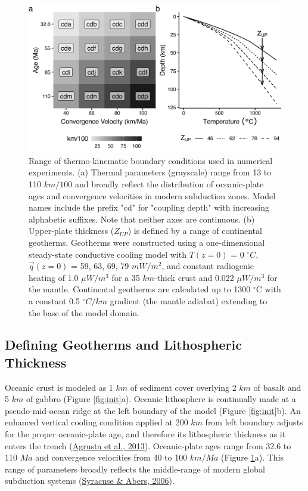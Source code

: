 \begin{figure}[htbp]

{\centering \includegraphics[width=1\linewidth,]{assets/figs/chpt2/fig2} 

}

\caption[Range of boundary conditions used in numerical experiments]{Range of thermo-kinematic boundary conditions used in numerical experiments. (a) Thermal parameters (grayscale) range from 13 to 110 $km/100$ and broadly reflect the distribution of oceanic-plate ages and convergence velocities in modern subduction zones. Model names include the prefix "cd" for "coupling depth" with increasing alphabetic suffixes. Note that neither axes are continuous. (b) Upper-plate thickness ($Z_{UP}$) is defined by a range of continental geotherms. Geotherms were constructed using a one-dimensional steady-state conductive cooling model with $T(z=0)$ = 0 $^{\circ}C$, $\vec{q}(z=0)$ = 59, 63, 69, 79 $mW/m^2$, and constant radiogenic heating of 1.0 $\mu W/m^3$ for a 35 $km$-thick crust and 0.022 $\mu W/m^3$ for the mantle. Continental geotherms are calculated up to 1300 $^{\circ}$C with a constant 0.5 $^{\circ}C/km$ gradient (the mantle adiabat) extending to the base of the model domain.}\label{fig:params}
\end{figure}

\hypertarget{numGeotherms}{%
\subsection{Defining Geotherms and Lithospheric Thickness}\label{numGeotherms}}

Oceanic crust is modeled as 1 \(km\) of sediment cover overlying 2 \(km\) of basalt and 5 \(km\) of gabbro (Figure \ref{fig:init}a). Oceanic lithosphere is continually made at a pseudo-mid-ocean ridge at the left boundary of the model (Figure \ref{fig:init}b). An enhanced vertical cooling condition applied at 200 \(km\) from left boundary adjusts for the proper oceanic-plate age, and therefore its lithospheric thickness as it enters the trench (\protect\hyperlink{ref-agrusta2013}{Agrusta et al., 2013}). Oceanic-plate ages range from 32.6 to 110 \(Ma\) and convergence velocities from 40 to 100 \(km/Ma\) (Figure \ref{fig:params}a). This range of parameters broadly reflects the middle-range of modern global subduction systems (\protect\hyperlink{ref-syracuse2006}{Syracuse \& Abers, 2006}).

